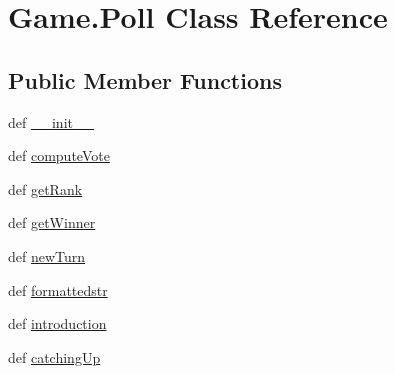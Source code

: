 \hypertarget{classGame_1_1Poll}{\section{\-Game.\-Poll \-Class \-Reference}
\label{classGame_1_1Poll}
}
\subsection*{\-Public \-Member \-Functions}
\begin{DoxyCompactItemize}
\item 
def \hyperlink{classGame_1_1Poll_afd96f4b0f4e4803b3da6f6494260d41c}{\-\_\-\-\_\-init\-\_\-\-\_\-}
\item 
def \hyperlink{classGame_1_1Poll_a3903be442b757965fe2a7ca00fc5aab7}{compute\-Vote}
\item 
def \hyperlink{classGame_1_1Poll_a4a6669f245973c3ef9565536ac055b97}{get\-Rank}
\item 
def \hyperlink{classGame_1_1Poll_a9667b4caa7ba397619c2bd2c4e7335e5}{get\-Winner}
\item 
def \hyperlink{classGame_1_1Poll_aff874d58fa1ee3c910abd1db950eebdd}{new\-Turn}
\item 
def \hyperlink{classGame_1_1Poll_a4d48a1823d18cba288b31ac2140cd0b3}{formattedstr}
\item 
def \hyperlink{classGame_1_1Poll_a932dcfa2b6ff73fb8f85b80ba146c004}{introduction}
\item 
def \hyperlink{classGame_1_1Poll_aabcf28c68c480a68fdd541907049481b}{catching\-Up}
\end{DoxyCompactItemize}
